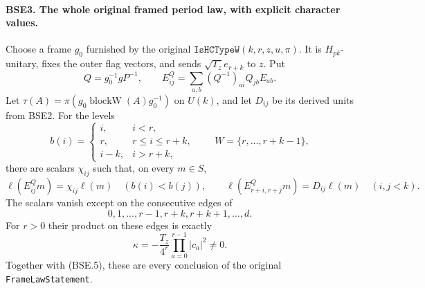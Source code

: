 \paragraph{BSE3. The whole original framed period law, with explicit character values.}
\label{claim:BSE3}
Choose a frame $g_0$ furnished by the original
$\texttt{IsHCTypeW}(k,r,z,u,\pi)$.
It is $H_{pk}$-unitary, fixes the outer flag vectors, and sends
$\sqrt{T_z}e_{r+k}$ to $z$.  Put
\[
 Q=g_0^{-1}gP^{-1},\qquad
 E^Q_{ij}=\sum_{a,b}(Q^{-1})_{ai}Q_{jb}E_{ab}.
 \tag{BSE.6}
\]
Let $\tau(A)=\pi(g_0\operatorname{blockW}(A)g_0^{-1})$ on
$U(k)$, and let $D_{ij}$ be its derived units from BSE2.
For the levels
\[
 b(i)=
 \begin{cases}
 i,&i<r,\\
 r,&r\le i\le r+k,\\
 i-k,&i>r+k,
 \end{cases}
 \qquad W=\{r,\ldots,r+k-1\},
 \tag{BSE.7}
\]
there are scalars $\chi_{ij}$ such that, on every $m\in S$,
\[
 \ell(E^Q_{ij}m)=\chi_{ij}\ell(m)\quad(b(i)<b(j)),\qquad
 \ell(E^Q_{r+i,r+j}m)=D_{ij}\ell(m)\quad(i,j<k).
 \tag{BSE.8}
\]
The scalars vanish except on the consecutive edges of
\[
                   0,1,\ldots,r-1,r+k,r+k+1,\ldots,d.
 \tag{BSE.9}
\]
For $r>0$ their product on these edges is exactly
\[
              \kappa=-\frac{T_z}{4^r}
                               \prod_{a=0}^{r-1}|c_a|^2\ne0.
 \tag{BSE.10}
\]
Together with (BSE.5), these are every conclusion of the original
\texttt{FrameLawStatement}.

